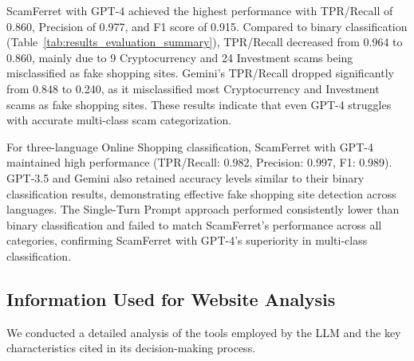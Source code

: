 \documentclass[runningheads]{llncs}
\begin{document}
ScamFerret with GPT-4 achieved the highest performance with TPR/Recall of 0.860, Precision of 0.977, and F1 score of 0.915.
Compared to binary classification (Table~\ref{tab:results_evaluation_summary}), TPR/Recall decreased from 0.964 to 0.860, mainly due to 9 Cryptocurrency and 24 Investment scams being misclassified as fake shopping sites.
Gemini's TPR/Recall dropped significantly from 0.848 to 0.240, as it misclassified most Cryptocurrency and Investment scams as fake shopping sites.
These results indicate that even GPT-4 struggles with accurate multi-class scam categorization.

For three-language Online Shopping classification, ScamFerret with GPT-4 maintained high performance (TPR/Recall: 0.982, Precision: 0.997, F1: 0.989).
GPT-3.5 and Gemini also retained accuracy levels similar to their binary classification results, demonstrating effective fake shopping site detection across languages.
The Single-Turn Prompt approach performed consistently lower than binary classification and failed to match ScamFerret's performance across all categories, confirming ScamFerret with GPT-4's superiority in multi-class classification.


















\subsection{Information Used for Website Analysis}
We conducted a detailed analysis of the tools employed by the LLM and the key characteristics cited in its decision-making process.
\end{document}
